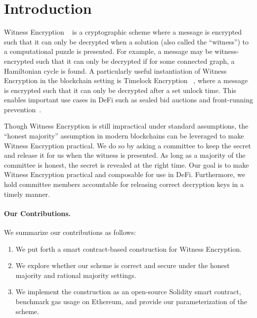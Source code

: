\section{Introduction}

Witness Encryption ~\cite{witness_encryption} is a cryptographic scheme where a message is encrypted such that it can only be decrypted when a solution (also called the ``witness'') to a computational puzzle is presented.
For example, a message may be witness-encrypted such that it can only be decrypted if for some connected graph, a Hamiltonian cycle is found.
A particularly useful instantiation of Witness Encryption in the blockchain setting is Timelock Encryption ~\cite{timelock_puzzles,timelock_from_crc,timed_release_cryptography}, where a message is encrypted such that it can only be decrypted after a set unlock time.
This enables important use cases in DeFi such as sealed bid auctions and front-running prevention~\cite{i-TiRE}.

Though Witness Encryption is still impractical under standard assumptions, the ``honest majority'' assumption in modern blockchains can be leveraged to make Witness Encryption practical.
We do so by asking a committee to keep the secret and release it for us when the witness is presented.
As long as a majority of the committee is honest, the secret is revealed at the right time.
Our goal is to make Witness Encryption practical and composable for use in DeFi.
Furthermore, we hold committee members accountable for releasing correct decryption keys in a timely manner.

\paragraph{Our Contributions.} We summarize our contributions as follows:
\begin{enumerate}
    \item We put forth a smart contract-based construction for Witness Encryption.
    \item We explore whether our scheme is correct and secure under the honest majority and rational majority settings.
    \item We implement the construction as an open-source Solidity smart contract, benchmark gas usage on Ethereum, and provide our parameterization of the scheme.
\end{enumerate}

